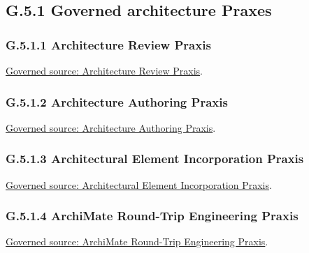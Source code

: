 \subsection*{G.5.1 Governed architecture Praxes}
\label{navigation:G.5.1}

\subsubsection*{G.5.1.1 Architecture Review Praxis}
\label{navigation:G.5.1.1}

\href{../../../../../../../../governance/architecture-review-praxis.md}{Governed source: Architecture Review Praxis}.\par
\subsubsection*{G.5.1.2 Architecture Authoring Praxis}
\label{navigation:G.5.1.2}

\href{../../../../../../../../governance/architecture-authoring-praxis.md}{Governed source: Architecture Authoring Praxis}.\par
\subsubsection*{G.5.1.3 Architectural Element Incorporation Praxis}
\label{navigation:G.5.1.3}

\href{../../../../../../../../governance/continuum-incorporation-praxis.md}{Governed source: Architectural Element Incorporation Praxis}.\par
\subsubsection*{G.5.1.4 ArchiMate Round-Trip Engineering Praxis}
\label{navigation:G.5.1.4}

\href{../../../../../../../../governance/archimate-round-trip-engineering-praxis.md}{Governed source: ArchiMate Round-Trip Engineering Praxis}.\par
